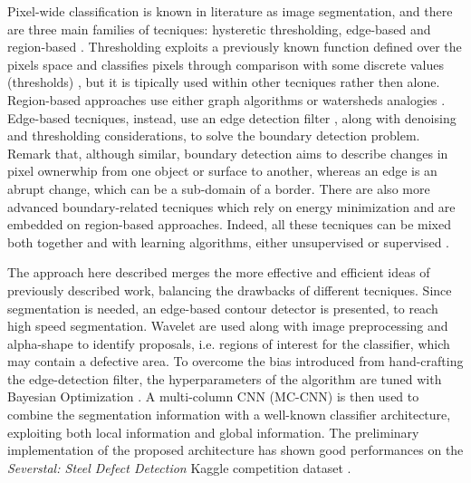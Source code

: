     \par{
        Pixel-wide classification is known in literature as image segmentation, and there are three main families of tecniques: hysteretic thresholding, edge-based and region-based \cite{ieee:7684170}. Thresholding exploits a previously known function defined over the pixels space and classifies pixels through comparison with some discrete values (thresholds) \cite{ieee:4310039}, but it is tipically used within other tecniques rather then alone. Region-based approaches use either graph algorithms \cite{ieee:6205760, ieee:868688} or watersheds analogies \cite{ieee:87344}. Edge-based tecniques, instead, use an edge detection filter \cite{Klette:2014:CCV:2584519, googlescholar:kovesiphase, researchgate:phase}, along with denoising and thresholding considerations, to solve the boundary detection problem. Remark that, although similar, boundary detection aims to describe changes in pixel ownerwhip from one object or surface to another, whereas an edge is an abrupt change, which can be a sub-domain of a border. There are also more advanced boundary-related tecniques \cite{springer:Kass1988} which rely on energy minimization and are embedded on region-based approaches. Indeed, all these tecniques can be mixed both together and with learning algorithms, either unsupervised \cite{ieee:7684170} or supervised \cite{ieee:1273918}.
    }
    \par{
        The approach here described merges the more effective and efficient ideas of previously described work, balancing the drawbacks of different tecniques. Since segmentation is needed, an edge-based contour detector is presented, to reach high speed segmentation. Wavelet are used along with image preprocessing and alpha-shape \cite{springer:10.1007/11907350_46} to identify proposals, i.e. regions of interest for the classifier, which may contain a defective area. To overcome the bias introduced from hand-crafting the edge-detection filter, the hyperparameters of the algorithm are tuned with Bayesian Optimization \cite{arXiv:2018arXiv180702811F, arXiv:2012arXiv1206.2944S, rasmussen:williams:2006}.
        A multi-column CNN (MC-CNN) \cite{ieee:6248110} is then used to combine the segmentation information with a well-known classifier architecture, exploiting both local information and global information. The preliminary implementation of the proposed architecture has shown good performances on the \emph{Severstal: Steel Defect Detection} Kaggle competition dataset \cite{kaggle:severstal}.
    }